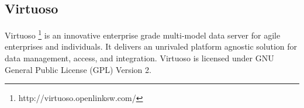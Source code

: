 \subsection{Virtuoso}
\label{sec:Sesame}
Virtuoso \footnote{http://virtuoso.openlinksw.com/} is an innovative enterprise grade multi-model data server for agile enterprises and individuals.
It delivers an unrivaled  platform agnostic solution for data management, access, and integration.
Virtuoso is licensed under GNU General Public License (GPL) Version 2.
